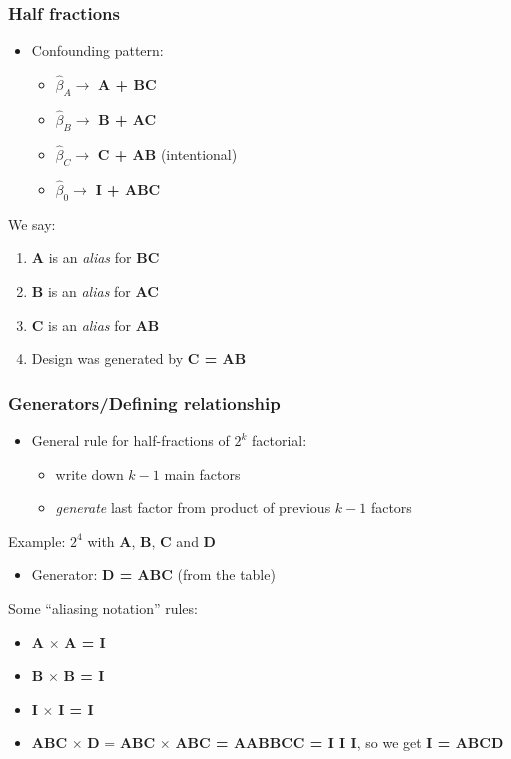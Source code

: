 \begin{frame}\frametitle{Half fractions}
	\begin{itemize}
		\item	Confounding pattern:
		\begin{itemize}
			\item	$\widehat{\beta}_A \rightarrow$ \textbf{A + BC}
			\item	$\widehat{\beta}_B \rightarrow$ \textbf{B + AC}
			\item	$\widehat{\beta}_C \rightarrow$ \textbf{C + AB} (intentional)
			\item	$\widehat{\beta}_0 \rightarrow$ \textbf{I + ABC}
		\end{itemize}
	\end{itemize}

	We say:
	\begin{enumerate}
		\item	\textbf{A} is an \emph{alias} for \textbf{BC}
		\item	\textbf{B} is an \emph{alias} for \textbf{AC}
		\item	\textbf{C} is an \emph{alias} for \textbf{AB}
		\item	Design was generated by \textbf{C = AB}
	\end{enumerate}
\end{frame}

\begin{frame}\frametitle{Generators/Defining relationship}
	\begin{itemize}
		\item	General rule for half-fractions of $2^k$ factorial:
		\begin{itemize}
			\item	write down $k-1$ main factors
			\item	\emph{generate} last factor from product of previous $k-1$ factors
		\end{itemize}
	\end{itemize}

	Example: $2^4$ with \textbf{A}, \textbf{B}, \textbf{C} and \textbf{D}
	\begin{itemize}
		\item	Generator: \textbf{D = ABC} (from the table)
	\end{itemize}

	Some ``aliasing notation'' rules:
	\begin{itemize}
		\item	\textbf{A} $\times$ \textbf{A = I}
		\item	\textbf{B} $\times$ \textbf{B = I}
		\item	\textbf{I} $\times$ \textbf{I = I}
		\item	\textbf{ABC} $\times$ \textbf{D} = \textbf{ABC} $\times$ \textbf{ABC = AABBCC = I I I}, so we get \textbf{I = ABCD}
	\end{itemize}
\end{frame}

